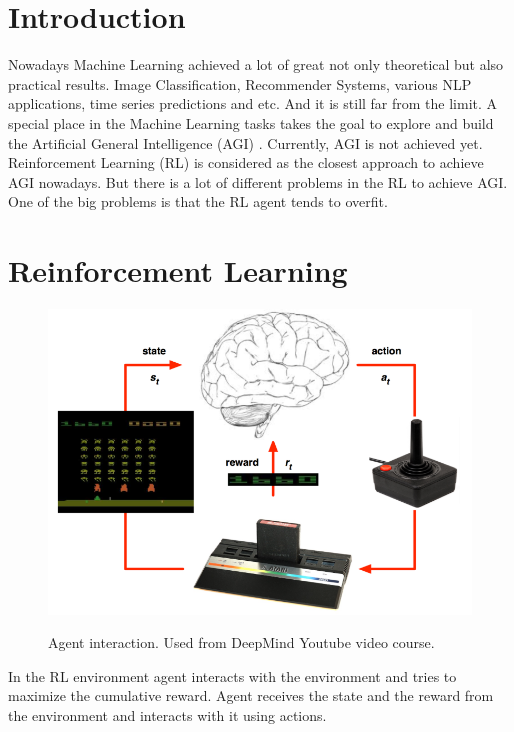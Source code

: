 \section{Introduction}

Nowadays Machine Learning achieved a lot of great not only theoretical but also practical results. Image Classification, Recommender Systems, various NLP applications, time series predictions and etc. And it is still far from the limit. A special place in the Machine Learning tasks takes the goal to explore and build the Artificial General Intelligence (AGI) \cite{AGI}. Currently, AGI is not achieved yet. Reinforcement Learning (RL) \cite{RL} is considered as the closest approach to achieve AGI nowadays. But there is a lot of different problems in the RL to achieve AGI. One of the big problems is that the RL agent tends to overfit.

\section{Reinforcement Learning}

\begin{figure}[H]
\centering
\includegraphics[scale=0.6]{RL_main_idea.png}\\[0.5cm] 
\caption{Agent interaction. Used from DeepMind Youtube video course.}
\end{figure}

In the RL environment agent interacts with the environment and tries to maximize the cumulative reward. Agent receives the state and the reward from the environment and interacts with it using actions.

